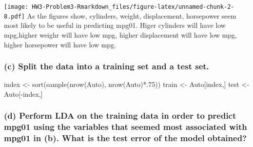 \documentclass[
]{article}
\newenvironment{Shaded}{\begin{snugshade}}{\end{snugshade}}
\newcommand{\AttributeTok}[1]{\textcolor[rgb]{0.77,0.63,0.00}{#1}}
\newcommand{\DecValTok}[1]{\textcolor[rgb]{0.00,0.00,0.81}{#1}}
\newcommand{\FunctionTok}[1]{\textcolor[rgb]{0.00,0.00,0.00}{#1}}
\newcommand{\NormalTok}[1]{#1}
\newcommand{\OtherTok}[1]{\textcolor[rgb]{0.56,0.35,0.01}{#1}}
\newcommand{\SpecialCharTok}[1]{\textcolor[rgb]{0.00,0.00,0.00}{#1}}
\begin{document}
\texttt{[image: HW3-Problem3-Rmarkdown\_files/figure-latex/unnamed-chunk-2-8.pdf]}
As the figures show, cylinders, weight, displacement, horsepower seem
most likely to be useful in predicting mpg01. Higer cylinders will have
low mpg,higher weighr will have low mpg, higher displacement will have
low mpg, higher horsepower will have low mpg.

\hypertarget{c-split-the-data-into-a-training-set-and-a-test-set.}{%
\subsubsection{(c) Split the data into a training set and a test
set.}\label{c-split-the-data-into-a-training-set-and-a-test-set.}}

\begin{Shaded}
\begin{Highlighting}[]
\NormalTok{index }\OtherTok{\textless{}{-}} \FunctionTok{sort}\NormalTok{(}\FunctionTok{sample}\NormalTok{(}\FunctionTok{nrow}\NormalTok{(Auto), }\FunctionTok{nrow}\NormalTok{(Auto)}\SpecialCharTok{*}\NormalTok{.}\DecValTok{75}\NormalTok{))}
\NormalTok{train }\OtherTok{\textless{}{-}}\NormalTok{ Auto[index,]}
\NormalTok{test }\OtherTok{\textless{}{-}}\NormalTok{ Auto[}\SpecialCharTok{{-}}\NormalTok{index,]}
\end{Highlighting}
\end{Shaded}

\hypertarget{d-perform-lda-on-the-training-data-in-order-to-predict-mpg01-using-the-variables-that-seemed-most-associated-with-mpg01-in-b.-what-is-the-test-error-of-the-model-obtained}{%
\subsubsection{(d) Perform LDA on the training data in order to predict
mpg01 using the variables that seemed most associated with mpg01 in (b).
What is the test error of the model
obtained?}\label{d-perform-lda-on-the-training-data-in-order-to-predict-mpg01-using-the-variables-that-seemed-most-associated-with-mpg01-in-b.-what-is-the-test-error-of-the-model-obtained}}

\begin{Shaded}
\end{Shaded}
\end{document}
